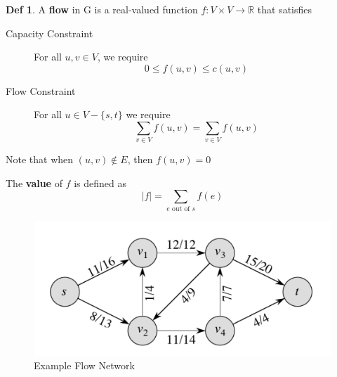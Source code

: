 \documentclass{article}
\theoremstyle{plain}
\theoremstyle{definition}
\newtheorem{defn}[dummy]{Def}
\begin{document}
    \begin{defn}
        A \textbf{flow} in G is a real-valued function $f : V \times V \to \mathbb{R}$ that satisfies

        \begin{description}
            \item[Capacity Constraint] For all $u, v \in V$, we require \[0 \leq f(u,v) \leq c(u,v)\]
            \item[Flow Constraint] For all $u \in V - \{ s,t \} $ we require \[ \sum_{v \in V} f(u,v) = \sum_{v \in V}f(u,v) \]
        \end{description}
        Note that when $(u,v) \notin E$, then $f(u,v) = 0$
    \end{defn}

    \noindent The \textbf{value} of $f$ is defined as
    \[ |f| = \sum_{e \text{ out of } s}f(e) \]
    
    \begin{figure}
            \centering
            \includegraphics[width=\linewidth]{images/flownetwork.png}
            \caption{Example Flow Network}
            \label{fig:flownetwork}
    \end{figure}
\end{document}
